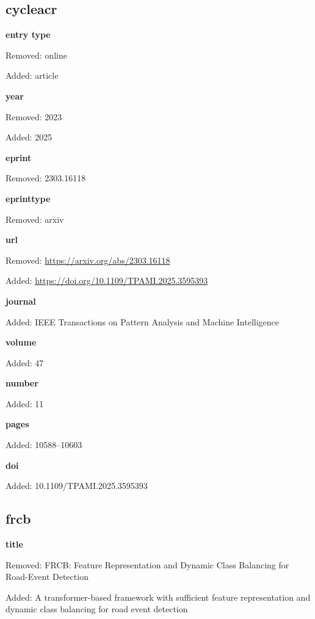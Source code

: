 \subsection*{cycleacr}
\noindent\textbf{entry type}\par
{\color{AuditRed}Removed: online\par}
{\color{AuditGreen}Added: article\par}
\noindent\textbf{year}\par
{\color{AuditRed}Removed: 2023\par}
{\color{AuditGreen}Added: 2025\par}
\noindent\textbf{eprint}\par
{\color{AuditRed}Removed: 2303.16118\par}
\noindent\textbf{eprinttype}\par
{\color{AuditRed}Removed: arxiv\par}
\noindent\textbf{url}\par
{\color{AuditRed}Removed: \url{https://arxiv.org/abs/2303.16118}\par}
{\color{AuditGreen}Added: \url{https://doi.org/10.1109/TPAMI.2025.3595393}\par}
\noindent\textbf{journal}\par
{\color{AuditGreen}Added: IEEE Transactions on Pattern Analysis and Machine Intelligence\par}
\noindent\textbf{volume}\par
{\color{AuditGreen}Added: 47\par}
\noindent\textbf{number}\par
{\color{AuditGreen}Added: 11\par}
\noindent\textbf{pages}\par
{\color{AuditGreen}Added: 10588–10603\par}
\noindent\textbf{doi}\par
{\color{AuditGreen}Added: 10.1109/TPAMI.2025.3595393\par}
\medskip

\subsection*{frcb}
\noindent\textbf{title}\par
{\color{AuditRed}Removed: FRCB: Feature Representation and Dynamic Class Balancing for Road-Event Detection\par}
{\color{AuditGreen}Added: A transformer-based framework with sufficient feature representation and dynamic class balancing for road event detection\par}
\medskip

